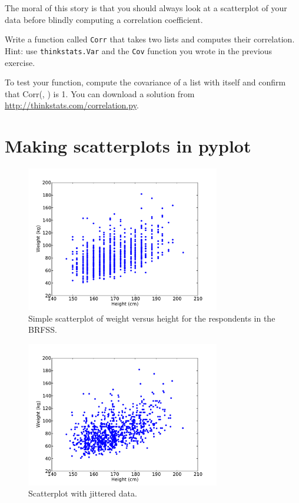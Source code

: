 \documentclass[12pt]{book}
\begin{document}
The moral of this story is that you should always look at a scatterplot of
your data before blindly computing a correlation coefficient.

\begin{exercise}
Write a function called {\tt Corr} that takes two lists and
computes their correlation.  Hint: use {\tt thinkstats.Var} and
the {\tt Cov} function you wrote in the previous exercise.

To test your function, compute the covariance of a list with itself
and confirm that Corr(\X, \X) is 1.  You can download a solution
from \url{http://thinkstats.com/correlation.py}.

\end{exercise}


\section{Making scatterplots in pyplot}

\begin{figure}
\centerline{\includegraphics[height=2.5in]{figs/scatter1.pdf}}
\caption{Simple scatterplot of weight versus height for the respondents
in the BRFSS.}
\label{scatterplot1}
\end{figure}

\begin{figure}
\centerline{\includegraphics[height=2.5in]{figs/scatter2.pdf}}
\caption{Scatterplot with jittered data.}
\label{scatterplot2}
\end{figure}
\end{document}
